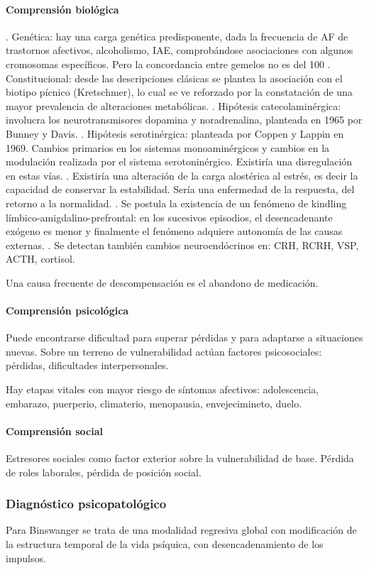 \documentclass{scrbook}
\begin{document}
\paragraph{Comprensión biológica}
. Genética: hay una carga genética predisponente, dada la frecuencia de AF de trastornos afectivos, alcoholismo, IAE, comprobándose asociaciones con algunos cromosomas específicos. Pero la concordancia entre gemelos no es del 100%
. Constitucional: desde las descripciones clásicas se plantea la asociación con el biotipo pícnico (Kretschmer), lo cual se ve reforzado por la constatación de una mayor prevalencia de alteraciones metabólicas.
. Hipótesis catecolaminérgica: involucra los neurotransmisores dopamina y noradrenalina, planteada en 1965 por Bunney y Davis.
. Hipótesis serotinérgica: planteada por Coppen y Lappin en 1969. Cambios primarios en los sistemas monoaminérgicos y cambios en la modulación realizada por el sistema serotoninérgico. Existiría una disregulación en estas vías.
. Existiría una alteración de la carga alostérica al estrés, es decir la capacidad de conservar la estabilidad. Sería una enfermedad de la respuesta, del retorno a la normalidad.
. Se postula la existencia de un fenómeno de kindling límbico-amigdalino-prefrontal: en los sucesivos episodios, el desencadenante exógeno es menor y finalmente el fenómeno adquiere autonomía de las causas externas.
. Se detectan también cambios neuroendócrinos en: CRH, RCRH, VSP, ACTH, cortisol.

Una causa frecuente de descompensación es el abandono de medicación.
\paragraph{Comprensión psicológica}
Puede encontrarse dificultad para superar pérdidas y para adaptarse a situaciones nuevas. Sobre un terreno de vulnerabilidad actúan factores psicosociales: pérdidas, dificultades interpersonales.

Hay etapas vitales con mayor riesgo de síntomas afectivos: adolescencia, embarazo, puerperio, climaterio, menopausia, envejecimineto, duelo.
\paragraph{Comprensión social}
Estresores sociales como factor exterior sobre la vulnerabilidad de base. Pérdida de roles laborales, pérdida de posición social.
\subsubsection*{Diagnóstico psicopatológico}
Para Binswanger se trata de una modalidad regresiva global con modificación de la estructura temporal de la vida psíquica, con desencadenamiento de los impulsos.
\end{document}
